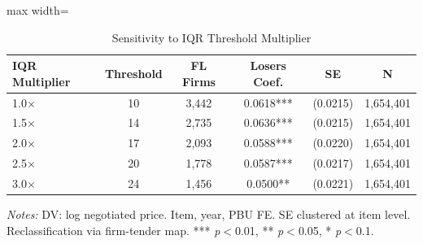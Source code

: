 \begin{table}[htbp]
\centering
\caption{Sensitivity to IQR Threshold Multiplier}
\label{tab:threshold_robustness}
\begin{adjustbox}{max width=\textwidth}
\begin{threeparttable}
\small
\begin{tabular}{lccccc}
\toprule
IQR Multiplier & Threshold & FL Firms & Losers Coef. & SE & N \\
\midrule
1.0$\times$ & 10 & 3,442 & 0.0618*** & (0.0215) & 1,654,401 \\
1.5$\times$ & 14 & 2,735 & 0.0636*** & (0.0215) & 1,654,401 \\
2.0$\times$ & 17 & 2,093 & 0.0588*** & (0.0220) & 1,654,401 \\
2.5$\times$ & 20 & 1,778 & 0.0587*** & (0.0217) & 1,654,401 \\
3.0$\times$ & 24 & 1,456 & 0.0500** & (0.0221) & 1,654,401 \\
\bottomrule
\end{tabular}
\begin{tablenotes}
\small
\item \textit{Notes:} DV: log negotiated price. Item, year, PBU FE.
SE clustered at item level. Reclassification via firm-tender map.
*** \textit{p}$<$0.01, ** \textit{p}$<$0.05, * \textit{p}$<$0.1.
\end{tablenotes}
\end{threeparttable}
\end{adjustbox}
\end{table}
